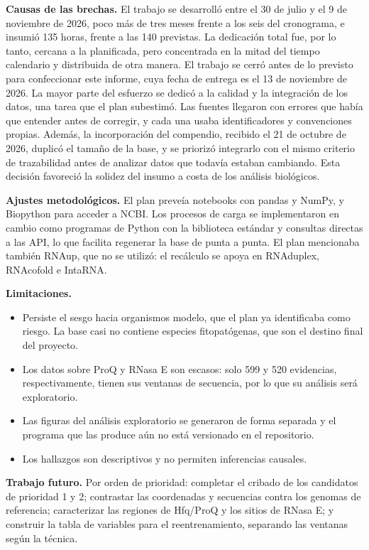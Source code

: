 \documentclass[11pt,a4paper]{article}
\begin{document}
\textbf{Causas de las brechas.} El trabajo se desarrolló entre el 30 de julio y el 9 de noviembre de 2026, poco más de tres meses frente a los seis del cronograma, e insumió 135 horas, frente a las 140 previstas. La dedicación total fue, por lo tanto, cercana a la planificada, pero concentrada en la mitad del tiempo calendario y distribuida de otra manera. El trabajo se cerró antes de lo previsto para confeccionar este informe, cuya fecha de entrega es el 13 de noviembre de 2026. La mayor parte del esfuerzo se dedicó a la calidad y la integración de los datos, una tarea que el plan subestimó. Las fuentes llegaron con errores que había que entender antes de corregir, y cada una usaba identificadores y convenciones propias. Además, la incorporación del compendio, recibido el 21 de octubre de 2026, duplicó el tamaño de la base, y se priorizó integrarlo con el mismo criterio de trazabilidad antes de analizar datos que todavía estaban cambiando. Esta decisión favoreció la solidez del insumo a costa de los análisis biológicos.

\textbf{Ajustes metodológicos.} El plan preveía notebooks con pandas y NumPy, y Biopython para acceder a NCBI. Los procesos de carga se implementaron en cambio como programas de Python con la biblioteca estándar y consultas directas a las API, lo que facilita regenerar la base de punta a punta. El plan mencionaba también RNAup, que no se utilizó: el recálculo se apoya en RNAduplex, RNAcofold e IntaRNA.

\textbf{Limitaciones.}
\begin{itemize}
  \item Persiste el sesgo hacia organismos modelo, que el plan ya identificaba como riesgo. La base casi no contiene especies fitopatógenas, que son el destino final del proyecto.
  \item Los datos sobre ProQ y RNasa E son escasos: solo 599 y 520 evidencias, respectivamente, tienen sus ventanas de secuencia, por lo que su análisis será exploratorio.
  \item Las figuras del análisis exploratorio se generaron de forma separada y el programa que las produce aún no está versionado en el repositorio.
  \item Los hallazgos son descriptivos y no permiten inferencias causales.
\end{itemize}

\textbf{Trabajo futuro.} Por orden de prioridad: completar el cribado de los candidatos de prioridad 1 y 2; contrastar las coordenadas y secuencias contra los genomas de referencia; caracterizar las regiones de Hfq/ProQ y los sitios de RNasa E; y construir la tabla de variables para el reentrenamiento, separando las ventanas según la técnica.
\end{document}
